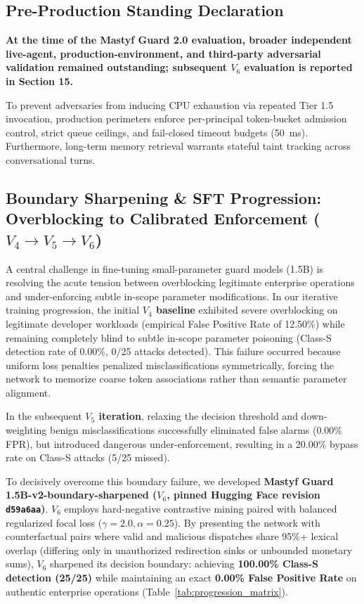 \documentclass[10pt,journal,compsoc]{IEEEtran}
\begin{document}
\subsection{Pre-Production Standing Declaration}
\textbf{At the time of the Mastyf Guard 2.0 evaluation, broader independent live-agent, production-environment, and third-party adversarial validation remained outstanding; subsequent $V_6$ evaluation is reported in Section 15.}

To prevent adversaries from inducing CPU exhaustion via repeated Tier 1.5 invocation, production perimeters enforce per-principal token-bucket admission control, strict queue ceilings, and fail-closed timeout budgets (50~ms). Furthermore, long-term memory retrieval warrants stateful taint tracking across conversational turns.

\subsection{Boundary Sharpening \& SFT Progression: Overblocking to Calibrated Enforcement ($V_4 \to V_5 \to V_6$)}
A central challenge in fine-tuning small-parameter guard models (1.5B) is resolving the acute tension between overblocking legitimate enterprise operations and under-enforcing subtle in-scope parameter modifications. In our iterative training progression, the initial \textbf{$V_4$ baseline} exhibited severe overblocking on legitimate developer workloads (empirical False Positive Rate of 12.50\%) while remaining completely blind to subtle in-scope parameter poisoning (Class-S detection rate of 0.00\%, 0/25 attacks detected). This failure occurred because uniform loss penalties penalized misclassifications symmetrically, forcing the network to memorize coarse token associations rather than semantic parameter alignment.

In the subsequent \textbf{$V_5$ iteration}, relaxing the decision threshold and down-weighting benign misclassifications successfully eliminated false alarms (0.00\% FPR), but introduced dangerous under-enforcement, resulting in a 20.00\% bypass rate on Class-S attacks (5/25 missed).

To decisively overcome this boundary failure, we developed \textbf{Mastyf Guard 1.5B-v2-boundary-sharpened ($V_6$, pinned Hugging Face revision \texttt{d59a6aa})}. $V_6$ employs hard-negative contrastive mining paired with balanced regularized focal loss ($\gamma = 2.0, \alpha = 0.25$). By presenting the network with counterfactual pairs where valid and malicious dispatches share 95\%+ lexical overlap (differing only in unauthorized redirection sinks or unbounded monetary sums), $V_6$ sharpened its decision boundary: achieving \textbf{100.00\% Class-S detection (25/25)} while maintaining an exact \textbf{0.00\% False Positive Rate} on authentic enterprise operations (Table~\ref{tab:progression_matrix}).
\end{document}
